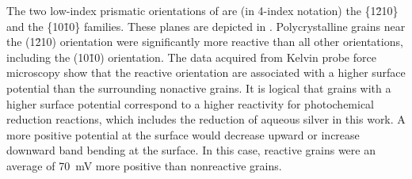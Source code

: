 The two low-index prismatic orientations  of  are (in 4-index notation) the \{1\={2}10\} and the \{10\={1}0\} families. These planes are depicted in . Polycrystalline grains near the (1\={2}10) orientation were significantly more reactive than all other orientations, including the (10\={1}0) orientation. The data acquired from Kelvin probe force microscopy show that the reactive orientation are associated with a higher surface potential than the surrounding nonactive grains. It is logical that grains with a higher surface potential correspond to a higher reactivity for photochemical reduction reactions, which includes the reduction of aqueous silver in this work. A more positive potential at the surface would decrease upward or increase downward band bending at the surface. In this case, reactive grains were an average of \SI{70}{\milli\volt} more positive than nonreactive grains. 

